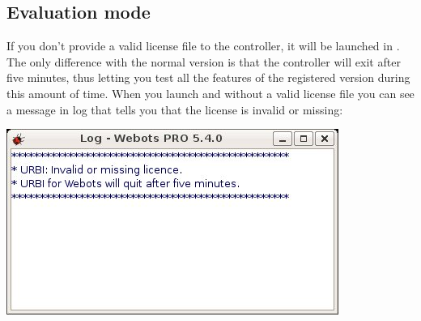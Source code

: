 




\subsection{Evaluation mode}

If you don't provide a valid license file to the \urbi controller, it
will be launched in . The only difference with
the normal version is that the controller will exit after five
minutes, thus letting you test all the features of the registered
version during this amount of time. When you launch \webots and \urbi
without a valid license file you can see a message in \webots log that
tells you that the license is invalid or missing:

\begin{center}
  \includegraphics{img/webots/no-license-webots-log-msg}
\end{center}


